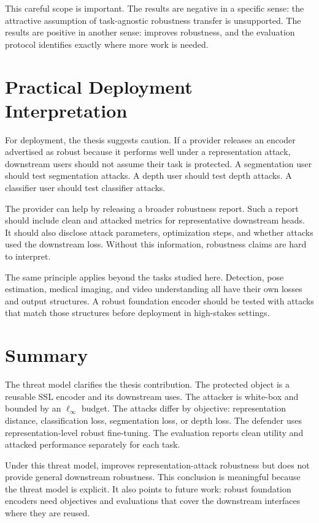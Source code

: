 This careful scope is important. The results are negative in a specific sense: the attractive assumption of task-agnostic robustness transfer is unsupported. The results are positive in another sense: \DeACL improves \EmbedAttack robustness, and the evaluation protocol identifies exactly where more work is needed.

\section{Practical Deployment Interpretation}

For deployment, the thesis suggests caution. If a provider releases an encoder advertised as robust because it performs well under a representation attack, downstream users should not assume their task is protected. A segmentation user should test segmentation attacks. A depth user should test depth attacks. A classifier user should test classifier attacks.

The provider can help by releasing a broader robustness report. Such a report should include clean and attacked metrics for representative downstream heads. It should also disclose attack parameters, optimization steps, and whether attacks used the downstream loss. Without this information, robustness claims are hard to interpret.

The same principle applies beyond the tasks studied here. Detection, pose estimation, medical imaging, and video understanding all have their own losses and output structures. A robust foundation encoder should be tested with attacks that match those structures before deployment in high-stakes settings.

\section{Summary}

The threat model clarifies the thesis contribution. The protected object is a reusable SSL encoder and its downstream uses. The attacker is white-box and bounded by an $\ell_\infty$ budget. The attacks differ by objective: representation distance, classification loss, segmentation loss, or depth loss. The defender uses \DeACL representation-level robust fine-tuning. The evaluation reports clean utility and attacked performance separately for each task.

Under this threat model, \DeACL improves representation-attack robustness but does not provide general downstream robustness. This conclusion is meaningful because the threat model is explicit. It also points to future work: robust foundation encoders need objectives and evaluations that cover the downstream interfaces where they are reused.
